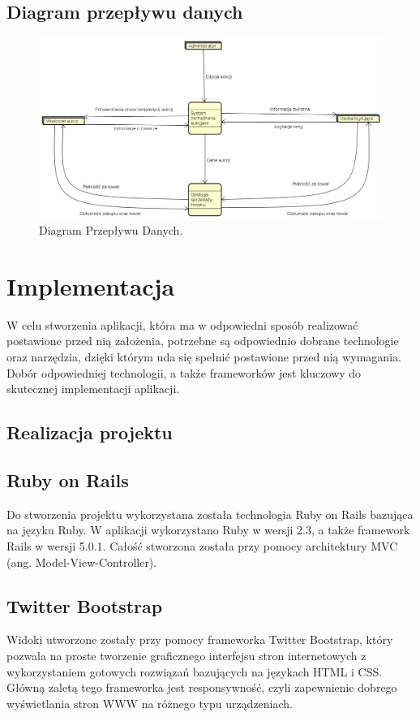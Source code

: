 \documentclass[brudnopis]{xmgr}
\begin{document}
\newpage

\section{Diagram przepływu danych}
\begin{figure}[!tbh]
\centering
\includegraphics[width=.9\linewidth]{fig/DFD}
\caption{Diagram Przepływu Danych.}
\end{figure}

\chapter{Implementacja}
W celu stworzenia aplikacji, która ma w odpowiedni sposób realizować postawione przed nią
założenia, potrzebne są odpowiednio dobrane technologie oraz narzędzia, dzięki którym uda się 
spełnić postawione przed nią wymagania. Dobór odpowiedniej technologii, a także frameworków 
jest kluczowy do skutecznej implementacji aplikacji.

\section{Realizacja projektu}


\section{Ruby on Rails}
Do stworzenia projektu wykorzystana została technologia Ruby on Rails bazująca na języku Ruby.
W aplikacji wykorzystano Ruby w wersji 2.3, a także framework Rails w wersji 5.0.1. Całość stworzona
została przy pomocy architektury MVC (ang. Model-View-Controller).

\section{Twitter Bootstrap}
Widoki utworzone zostały przy pomocy frameworka Twitter Bootstrap, który pozwala na proste tworzenie
graficznego interfejsu stron internetowych z wykorzystaniem gotowych rozwiązań bazujących na językach
HTML i CSS. Główną zaletą tego frameworka jest responsywność, czyli zapewnienie dobrego wyświetlania
stron WWW na różnego typu urządzeniach. 
\end{document}
